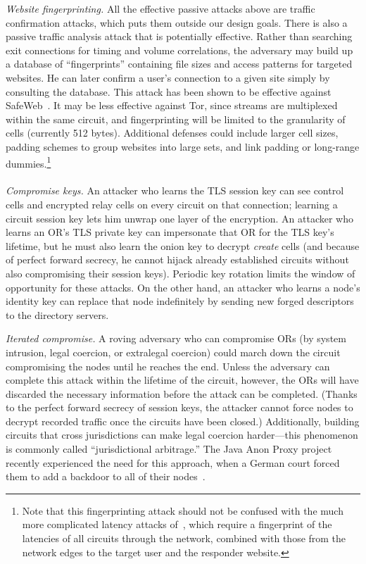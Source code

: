 \documentclass[times,10pt,twocolumn]{article}
\begin{document}
\emph{Website fingerprinting.} All the effective passive
attacks above are traffic confirmation attacks,
which puts them outside our design goals. There is also
a passive traffic analysis attack that is potentially effective.
Rather than searching exit connections for timing and volume
correlations, the adversary may build up a database of
``fingerprints'' containing file sizes and access patterns for
targeted websites. He can later confirm a user's connection to a given
site simply by consulting the database. This attack has
been shown to be effective against SafeWeb~\cite{hintz-pet02}.
It may be less effective against Tor, since
streams are multiplexed within the same circuit, and
fingerprinting will be limited to
the granularity of cells (currently 512 bytes). Additional
defenses could include
larger cell sizes, padding schemes to group websites
into large sets, and link
padding or long-range dummies.\footnote{Note that this fingerprinting
attack should not be confused with the much more complicated latency
attacks of~\cite{back01}, which require a fingerprint of the latencies
of all circuits through the network, combined with those from the
network edges to the target user and the responder website.}\\

\\
\emph{Compromise keys.} An attacker who learns the TLS session key can
see control cells and encrypted relay cells on every circuit on that
connection; learning a circuit
session key lets him unwrap one layer of the encryption. An attacker
who learns an OR's TLS private key can impersonate that OR for the TLS
key's lifetime, but he must
also learn the onion key to decrypt \emph{create} cells (and because of
perfect forward secrecy, he cannot hijack already established circuits
without also compromising their session keys). Periodic key rotation
limits the window of opportunity for these attacks. On the other hand,
an attacker who learns a node's identity key can replace that node
indefinitely by sending new forged descriptors to the directory servers.

\emph{Iterated compromise.} A roving adversary who can
compromise ORs (by system intrusion, legal coercion, or extralegal
coercion) could march down the circuit compromising the
nodes until he reaches the end.  Unless the adversary can complete
this attack within the lifetime of the circuit, however, the ORs
will have discarded the necessary information before the attack can
be completed.  (Thanks to the perfect forward secrecy of session
keys, the attacker cannot force nodes to decrypt recorded
traffic once the circuits have been closed.)  Additionally, building
circuits that cross jurisdictions can make legal coercion
harder---this phenomenon is commonly called ``jurisdictional
arbitrage.'' The Java Anon Proxy project recently experienced the
need for this approach, when
a German court forced them to add a backdoor to
all of their nodes~\cite{jap-backdoor}.
\end{document}
